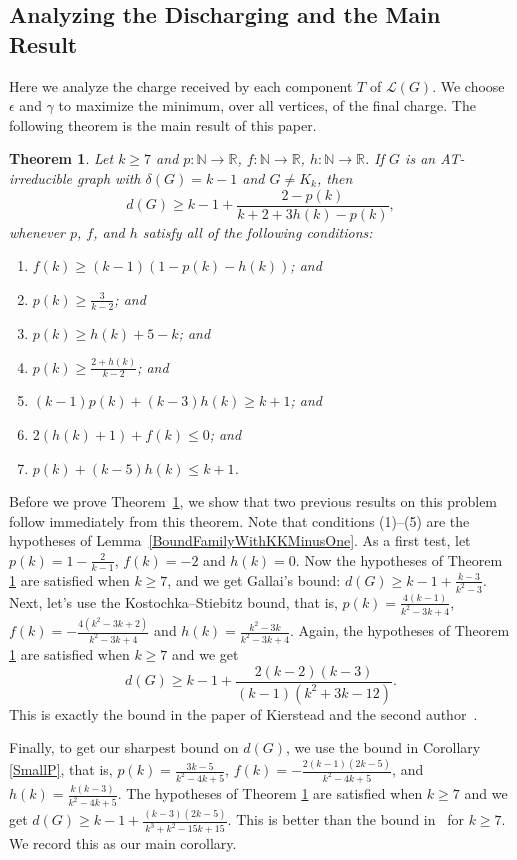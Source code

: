 \documentclass[12pt]{article}
\theoremstyle{plain}
\newtheorem{thm}{Theorem}[section]
\theoremstyle{definition}
\theoremstyle{remark}
\newcommand{\fancy}[1]{\mathcal{#1}}
\newcommand{\IN}{\mathbb{N}}
\newcommand{\IR}{\mathbb{R}}
\renewcommand{\L}{\fancy{L}}
\newcommand{\func}[3]{#1\colon #2 \rightarrow #3}
\begin{document}
\subsection{Analyzing the Discharging and the Main Result}
\label{discharging-analyzing}
Here we analyze the charge received by each component $T$ of $\L(G)$.  We
choose $\epsilon$ and $\gamma$ to maximize the minimum, over all vertices, of
the final charge.  The following theorem is the main result of this paper.

\begin{thm}\label{UberTheorem}
	Let $k \ge 7$ and $\func{p}{\IN}{\IR}$, $\func{f}{\IN}{\IR}$, $\func{h}{\IN}{\IR}$.  If $G$ is an AT-irreducible graph with $\delta(G) = k-1$ and $G\ne K_k$, then 
	\[d(G) \ge k-1 + \frac{2-p(k)}{k+2 + 3h(k) - p(k)},\]
	whenever $p$, $f$, and $h$ satisfy all of the following conditions:
	\begin{enumerate}
	\item[(1)] $f(k) \ge (k-1)(1- p(k) - h(k))$; and	
	\item[(2)] $p(k) \ge \frac{3}{k-2}$; and
	\item[(3)] $p(k) \ge h(k) + 5 - k$; and
	\item[(4)] $p(k) \ge \frac{2+h(k)}{k-2}$; and
	\item[(5)] $(k-1)p(k) + (k-3)h(k) \ge k+1$; and
	\item[(6)] $2(h(k) + 1) + f(k) \le 0$; and
	\item[(7)] $p(k) + (k-5)h(k) \le k+1$.
	\end{enumerate}
\end{thm}

Before we prove Theorem~\ref{UberTheorem}, we show that two previous results on
this problem follow immediately from this theorem.  Note that conditions
(1)--(5) are the hypotheses of Lemma~\ref{BoundFamilyWithKKMinusOne}.  As a
first test, let $p(k) = 1 - \frac{2}{k-1}$, $f(k) = -2$ and $h(k) = 0$.  Now
the hypotheses of Theorem \ref{UberTheorem} are satisfied when $k\ge7$, and we
get Gallai's bound: $d(G) \ge k-1 + \frac{k-3}{k^2-3}$.  Next, let's use the
Kostochka--Stiebitz bound, that is, $p(k) = \frac{4(k-1)}{k^2 - 3k + 4}$, $f(k)
= -\frac{4(k^2-3k+2)}{k^2-3k+4}$ and $h(k) = \frac{k^2 - 3k}{k^2-3k+4}$. 
Again, the hypotheses of Theorem \ref{UberTheorem} are satisfied when $k \ge 7$
and we get
%
\[d(G) \ge k-1 + \frac{2(k-2)(k-3)}{(k-1)(k^2 + 3k - 12)}.\]
%
This is exactly the bound in the paper of Kierstead and the second
author~\cite{OreVizing}.  

Finally, to get our sharpest bound on $d(G)$, we use the bound in Corollary
\ref{SmallP}, that is, $p(k) = \frac{3k-5}{k^2 - 4k + 5}$, $f(k) =
-\frac{2(k-1)(2k-5)}{k^2 - 4k + 5}$, and $h(k) = \frac{k(k-3)}{k^2 - 4k + 5}$. 
The hypotheses of Theorem \ref{UberTheorem} are satisfied when $k\ge7$ and we
get $d(G) \ge k-1 + \frac{(k-3)(2k-5)}{k^3 + k^2 - 15k + 15}.$ This is better
than the bound in~\cite{OreVizing} for $k \ge 7$.  We record this as our main
corollary.
\end{document}
